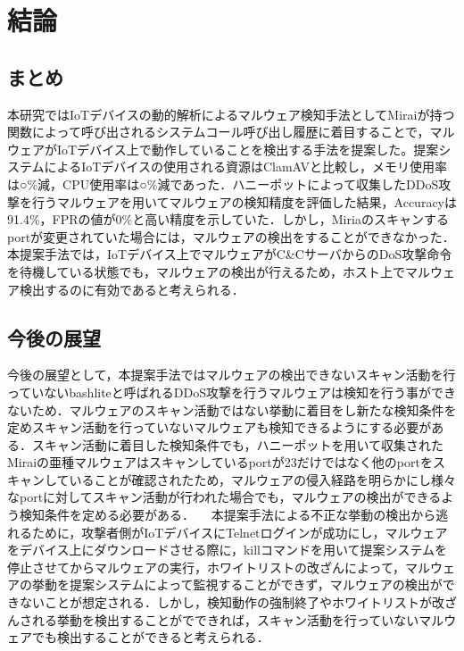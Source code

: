 \chapter{結論}

\section{まとめ}
本研究ではIoTデバイスの動的解析によるマルウェア検知手法としてMiraiが持つ関数によって呼び出されるシステムコール呼び出し履歴に着目することで，マルウェアがIoTデバイス上で動作していることを検出する手法を提案した。提案システムによるIoTデバイスの使用される資源はClamAVと比較し，メモリ使用率は○\%減，CPU使用率は○\%減であった．ハニーポットによって収集したDDoS攻撃を行うマルウェアを用いてマルウェアの検知精度を評価した結果，Accuracyは91.4\%，FPRの値が0\%と高い精度を示していた．しかし，Miriaのスキャンするportが変更されていた場合には，マルウェアの検出をすることができなかった．
本提案手法では，IoTデバイス上でマルウェアがC\&CサーバからのDoS攻撃命令を待機している状態でも，マルウェアの検出が行えるため，ホスト上でマルウェア検出するのに有効であると考えられる．

\section{今後の展望}
今後の展望として，本提案手法ではマルウェアの検出できないスキャン活動を行っていないbashliteと呼ばれるDDoS攻撃を行うマルウェアは検知を行う事ができないため．マルウェアのスキャン活動ではない挙動に着目をし新たな検知条件を定めスキャン活動を行っていないマルウェアも検知できるようにする必要がある．スキャン活動に着目した検知条件でも，ハニーポットを用いて収集されたMiraiの亜種マルウェアはスキャンしているportが23だけではなく他のportをスキャンしていることが確認されたため，マルウェアの侵入経路を明らかにし様々なportに対してスキャン活動が行われた場合でも，マルウェアの検出ができるよう検知条件を定める必要がある．
　本提案手法による不正な挙動の検出から逃れるために，攻撃者側がIoTデバイスにTelnetログインが成功にし，マルウェアをデバイス上にダウンロードさせる際に，killコマンドを用いて提案システムを停止させてからマルウェアの実行，ホワイトリストの改ざんによって，マルウェアの挙動を提案システムによって監視することができず，マルウェアの検出ができないことが想定される．しかし，検知動作の強制終了やホワイトリストが改ざんされる挙動を検出することがでできれば，スキャン活動を行っていないマルウェアでも検出することができると考えられる．
